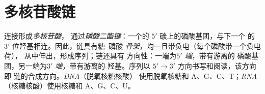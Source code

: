 \section{多核苷酸链}

\begin{definition}[磷酸二酯键与极性]\label{def:b1:nucleic-acids:chain}
连接形成\emph{多核苷酸}，
通过\emph{磷酸二酯键}：一个的
$5'$ 碳上的磷酸基团，与下一个
的 $3'$ 位羟基相连。因此，链具有糖–磷酸
\emph{骨架}，均一且带负电（每个磷酸带一个负电荷），
从中伸出，形成序列；链还具有
方向性：一端为\emph{$5'$ 端}，带有游离的
磷酸基团，另一端为\emph{$3'$ 端}，带有游离的
羟基。序列以 $5' \to 3'$ 方向书写和阅读，该方向即
链的合成方向。\emph{DNA}（脱氧核糖核酸）
使用脱氧核糖和 A、G、C、T；\emph{RNA}
（核糖核酸）使用核糖和 A、G、C、U。
\end{definition}

